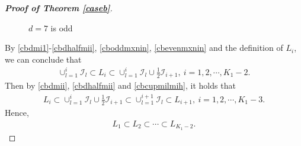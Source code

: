 \documentclass[12pt]{amsart}
\theoremstyle{plain}
\theoremstyle{definition}
\begin{document}
\begin{proof}[\textbf{Proof of Theorem \ref{caseb}}]
\begin{figure}[H]
\caption{$d=7$ is odd}
\label{figlio}
	
\end{figure}
	
	
	 By \eqref{cbdmi1}-\eqref{cbdhalfmii}, \eqref{cboddmxnin}, \eqref{cbevenmxnin} and the definition of $L_i$, we can conclude that 
	\begin{align}
		\cup_{l=1}^{i}\mathcal{I}_l\subset L_i\subset \cup_{l=1}^{i}\mathcal{I}_l\cup\frac{1}{2}\mathcal{I}_{i+1},\ i=1,2,\cdots,K_1-2.\label{cbcupmilmih}
	\end{align}
Then by \eqref{cbdmii}, \eqref{cbdhalfmii} and \eqref{cbcupmilmih}, it holds that
\begin{align}
L_i\subset\cup_{l=1}^{i}\mathcal{I}_l\cup\frac{1}{2}\mathcal{I}_{i+1}\subset \cup_{l=1}^{i+1}\mathcal{I}_l\subset L_{i+1},\ i=1,2,\cdots,K_1-3.\nonumber
\end{align}
Hence,
	\begin{align}
		L_1\subset L_2\subset\cdots\subset L_{K_1-2}.\label{cbl1l2lk}
	\end{align}
	

\end{proof}
\end{document}
